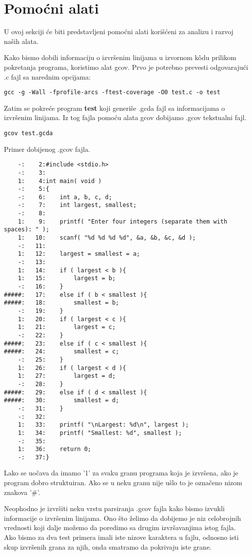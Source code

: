 \documentclass[a4paper]{article}
\begin{document}
\section{Pomoćni alati}
\label{sec:tools}

U ovoj sekciji će biti predstavljeni pomoćni alati korišćeni za analizu i razvoj naših alata.

Kako bismo dobili informaciju o izvršenim linijama u izvornom kôdu prilikom pokretanja programa, koristimo alat gcov. Prvo je potrebno prevesti odgovarajući .c fajl sa narednim opcijama:

\begin{verbatim}
gcc -g -Wall -fprofile-arcs -ftest-coverage -O0 test.c -o test
\end{verbatim}

Zatim se pokreće program \textbf{test} koji generiše .gcda fajl sa informacijama o izvršenim linijama. Iz tog fajla pomoću alata gcov dobijamo .gcov tekstualni fajl.

\begin{verbatim}
gcov test.gcda
\end{verbatim}

Primer dobijenog .gcov fajla.
\begin{lstlisting}
	-:    2:#include <stdio.h>
	-:    3:
	1:    4:int main( void )
	-:    5:{   
	-:    6:    int a, b, c, d;
	-:    7:    int largest, smallest;
	-:    8:
	1:    9:    printf( "Enter four integers (separate them with spaces): " );
	1:   10:    scanf( "%d %d %d %d", &a, &b, &c, &d );
	-:   11:
	1:   12:    largest = smallest = a;
	-:   13:
	1:   14:    if ( largest < b ){
	1:   15:        largest = b;
	-:   16:    }
#####:   17:    else if ( b < smallest ){
#####:   18:        smallest = b;
	-:   19:    }
	1:   20:    if ( largest < c ){
	1:   21:        largest = c;
	-:   22:    }
#####:   23:    else if ( c < smallest ){
#####:   24:        smallest = c;
	-:   25:    }
	1:   26:    if ( largest < d ){
	1:   27:        largest = d;
	-:   28:    }
#####:   29:    else if ( d < smallest ){
#####:   30:        smallest = d;
	-:   31:    }
	-:   32:
	1:   33:    printf( "\nLargest: %d\n", largest );
	1:   34:    printf( "Smallest: %d", smallest );
	-:   35:
	1:   36:    return 0;
	-:   37:}
\end{lstlisting}

Lako se uočava da imamo '1' za svaku granu programa koja je izvršena, ako je program dobro struktuiran. Ako se u neku granu nije ušlo to je označeno nizom znakova '\#'.

Neophodno je izvršiti neku vrstu parsiranja .gcov fajla kako bismo izvukli informacije o izvršenim linijama. Ono što želimo da dobijemo je niz celobrojnih vrednosti koji dalje možemo da poredimo sa drugim izvršavanjima istog fajla. Ako bismo za dva test primera imali iste nizove karaktera u fajlu, odnosno isti skup izvršenih grana za njih, onda smatramo da pokrivaju iste grane. 
\end{document}
